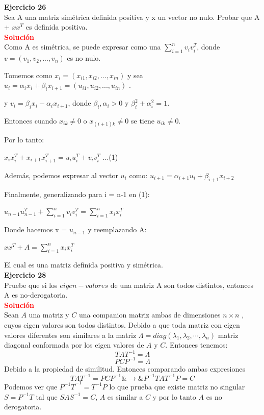 \documentclass[12pt]{article}
\begin{document}
\noindent \textbf{Ejercicio 26}\\
Sea A una matriz simétrica definida positiva y x un vector no nulo. Probar que A + $xx^T$ es definida positiva.\\

\noindent \textcolor{red}{\bf Solución}\\
Como A es simétrica, se puede expresar como una $\sum_{i=1}^{n} v_i v_i ^T$, donde $v = (v_1, v_2, ..., v_n) $ es no nulo.

Tomemos como $x_i = (x_{i1}, x_{i2}, ..., x_{in})$ y sea $u_i = \alpha_i x_i + \beta_i x_{i+1} = (u_{i1}, u_{i2}, ..., u_{in})$ .

y $v_i = \beta_i x_{i} - \alpha_i x_{i+1}$, donde $\beta_i , \alpha_i >0$ y $\beta_i^2 + \alpha_i ^2 = 1  $.

Entonces cuando $x_{ik} \neq 0 $ o $x_{(i+1)k} \neq 0 $ se tiene $u_{ik} \neq 0$.

Por lo tanto:
\begin{center}
    $x_i x_i ^T + x_{i+1} x_{i+1} ^T = u_i u_i ^T + v_i v_i ^T$ ...(1)
\end{center}

Además, podemos expresar al vector $u_i$ como:
$u_{i+1} = \alpha_{i+1} u_i + \beta_{i+1} x_{i+2}$

Finalmente, generalizando para i = n-1 en (1):
\begin{center}
    $u_{n-1} u_{n-1}^T + \sum_{i=1}^{n} v_i v_i ^T = \sum_{i=1}^{n} x_i x_i ^T$
\end{center}
Donde hacemos x = $u_{n-1}$ y reemplazando A:
\begin{center}
    $x x^T + A = \sum_{i=1}^{n} x_i x_i ^T$
\end{center}
El cual es una matriz definida positiva y simétrica.\\

\noindent \textbf{Ejercicio 28}\\
Pruebe que si los $eigen-valores$ de una matriz A son todos distintos, entonces A es no-derogatoria.\\

\noindent \textcolor{red}{\bf Solución}\\
Sean $A$ una matriz y $C$ una companion matriz ambas de dimensiones $n \times n$ , cuyos eigen valores son todos distintos. Debido a que toda matriz con eigen valores diferentes son similares a la matriz $ \Lambda = diag(\lambda_1, \lambda_2, \cdots , \lambda_n )$ matriz diagonal conformada por los eigen valores de $A$ y $C$. Entonces tenemos:
$$
TAT^{-1}= \Lambda
$$
$$
PCP^{-1}= \Lambda
$$
Debido a la propiedad de similitud. Entonces comparando ambas expresiones
$$ TAT^{-1}= PCP^{-1} \& \rightarrow \& P^{-1}TAT^{-1}P = C $$
Podemos ver que $ {P^{-1}T}^{-1}=T^{-1}P $ lo que prueba que existe matriz no singular $S=P^{-1}T$ tal que $SAS^{-1} = C$,
$A$ es similar a $C$ y por lo tanto $A$ es no derogatoria.\\
\end{document}
